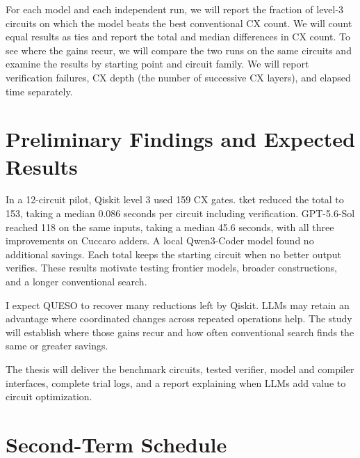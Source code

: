 \documentclass[12pt]{article}
\begin{document}
For each model and each independent run, we will report the fraction of level-3 circuits on which the model beats the best conventional CX count. We will count equal results as ties and report the total and median differences in CX count. To see where the gains recur, we will compare the two runs on the same circuits and examine the results by starting point and circuit family. We will report verification failures, CX depth (the number of successive CX layers), and elapsed time separately.

\section{Preliminary Findings and Expected Results}

In a 12-circuit pilot, Qiskit level 3 used 159 CX gates. tket reduced the total to 153, taking a
median 0.086 seconds per circuit including verification. GPT-5.6-Sol reached 118 on the same inputs,
taking a median 45.6 seconds, with all three improvements on Cuccaro adders. A local Qwen3-Coder
model found no additional savings. Each total keeps the starting circuit when no better output
verifies. These results motivate testing frontier models, broader constructions, and a longer
conventional search.

I expect QUESO to recover many reductions left by Qiskit. LLMs may retain an advantage where
coordinated changes across repeated operations help. The study will establish where those gains recur and how often conventional search finds the same or greater savings.

The thesis will deliver the benchmark circuits, tested verifier, model and compiler interfaces,
complete trial logs, and a report explaining when LLMs add value to circuit optimization.

\section{Second-Term Schedule}
\end{document}
